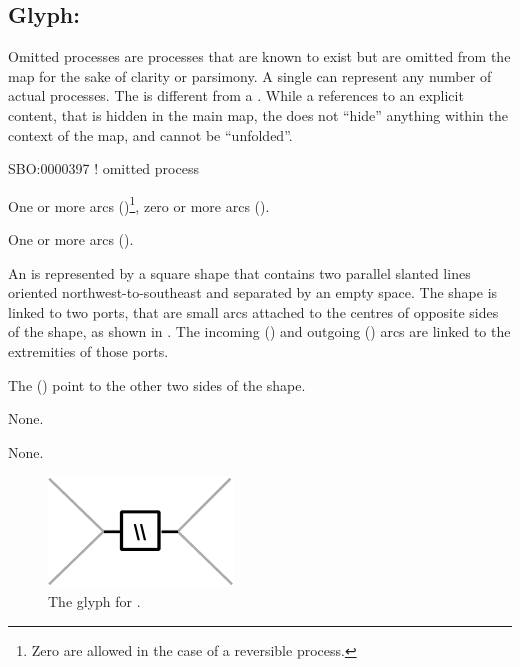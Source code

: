\subsection{Glyph: }
\label{sec:omitted}

Omitted processes are processes that are known to exist but are omitted from the map for the sake of clarity or parsimony. A single  can represent any number of actual processes. The  is different from a . While a  references to an explicit content, that is hidden in the main map, the  does not ``hide'' anything within the context of the map, and cannot be ``unfolded''.

\begin{glyphDescription}

\glyphSboTerm
SBO:0000397 ! omitted process

\glyphIncoming
One or more  arcs ()\footnote{Zero  are allowed in the case of a reversible process.}, zero or more  arcs ().

\glyphOutgoing
One or more  arcs ().

\glyphContainer
An  is represented by a square shape that contains two parallel slanted lines oriented northwest-to-southeast and separated by an empty space.
The shape is linked to two ports, that are small arcs attached to the centres of opposite sides of the shape, as shown in .
The incoming  () and outgoing  () arcs are linked to the extremities of those ports.

The  () point to the other two sides of the shape.

\glyphLabel
None.

\glyphAux
None.

\end{glyphDescription}

\begin{figure}[H]
  \centering
  \includegraphics{images/build/omitted.pdf}
  \caption{The \PD glyph for .}
  \label{fig:omitted}
\end{figure}
